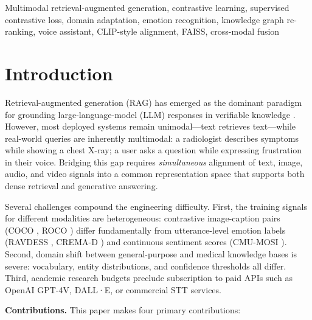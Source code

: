 \documentclass[10pt,conference]{IEEEtran}
\theoremstyle{ieeethm}
\theoremstyle{ieeedef}
\theoremstyle{ieeeremark}
\begin{document}
\begin{IEEEkeywords}
Multimodal retrieval-augmented generation, contrastive learning, supervised contrastive loss, domain adaptation, emotion recognition, knowledge graph re-ranking, voice assistant, CLIP-style alignment, FAISS, cross-modal fusion
\end{IEEEkeywords}

\section{Introduction}
\label{sec:intro}

Retrieval-augmented generation (RAG) has emerged as the dominant paradigm for grounding large-language-model (LLM) responses in verifiable knowledge \cite{lewis2020retrieval}. However, most deployed systems remain unimodal—text retrieves text—while real-world queries are inherently multimodal: a radiologist describes symptoms while showing a chest X-ray; a user asks a question while expressing frustration in their voice. Bridging this gap requires \emph{simultaneous} alignment of text, image, audio, and video signals into a common representation space that supports both dense retrieval and generative answering.

Several challenges compound the engineering difficulty. First, the training signals for different modalities are heterogeneous: contrastive image-caption pairs (COCO \cite{lin2014microsoft}, ROCO \cite{pelka2018radiology}) differ fundamentally from utterance-level emotion labels (RAVDESS \cite{livingstone2018ryerson}, CREMA-D \cite{cao2014crema}) and continuous sentiment scores (CMU-MOSI \cite{zadeh2016mosi}). Second, domain shift between general-purpose and medical knowledge bases is severe: vocabulary, entity distributions, and confidence thresholds all differ. Third, academic research budgets preclude subscription to paid APIs such as OpenAI GPT-4V, DALL·E, or commercial STT services.

\textbf{Contributions.} This paper makes four primary contributions:
\end{document}
